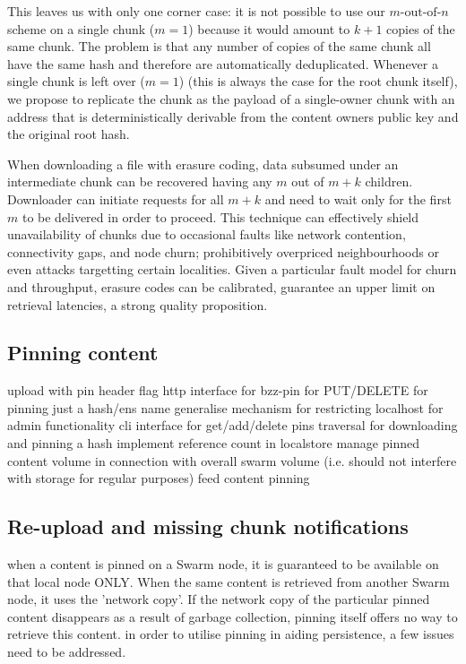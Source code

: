 This leaves us with only one corner case: it is not possible to use our $m\text{-out-of-}n$ scheme on a single chunk ($m=1$) because it would amount to $k+1$ copies of the same chunk. The problem is that any number of copies of the same chunk all have the same hash and therefore are automatically deduplicated. Whenever a single chunk is left over ($m=1$) (this is always the case for the root chunk itself), we propose to replicate the chunk as the payload of a single-owner chunk with an address that is deterministically derivable from the content owners public key and the original root hash. 

When downloading a file with erasure coding, data subsumed under an intermediate chunk can be recovered having any $m$ out of $m+k$ children. Downloader can initiate requests for all $m+k$ and need to wait  only for the first $m$ to be delivered in order to proceed.  
This technique can effectively shield unavailability of chunks due to occasional faults like network contention, connectivity gaps, and node churn; prohibitively overpriced neighbourhoods or even attacks targetting certain localities. Given a particular fault model for churn and throughput, erasure codes can be calibrated,
guarantee an upper limit on retrieval latencies, a strong quality proposition.





\subsection{Pinning content}\label{sec:pinning}



    upload with pin header flag
    http interface for bzz-pin for PUT/DELETE for pinning just a hash/ens name
    generalise mechanism for restricting localhost for admin functionality
    cli interface for get/add/delete pins
    traversal for downloading and pinning a hash
    implement reference count in localstore
    manage pinned content volume in connection with overall swarm volume (i.e. should not interfere with storage for regular purposes)
    feed content pinning

\subsection{Re-upload and missing chunk notifications}\label{sec:reupload}

 when a content is pinned on a Swarm node, it is guaranteed to be available on that local node ONLY. When the same content is retrieved from another Swarm node, it uses the 'network copy'. If the network copy of the particular pinned content disappears as a result of garbage collection, pinning itself offers no way to retrieve this content. in order to utilise pinning in aiding persistence, a few issues need to be addressed.

